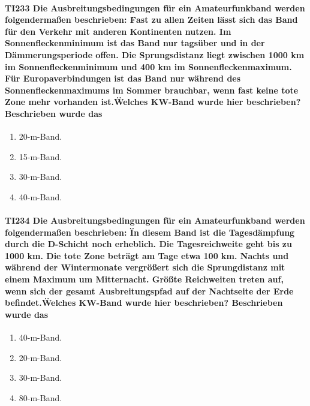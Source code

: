 \documentclass[8pt]{article}
\begin{document}
\paragraph*{TI233 Die Ausbreitungsbedingungen für ein Amateurfunkband werden folgendermaßen beschrieben: \"Fast zu allen Zeiten lässt sich das Band für den Verkehr mit anderen Kontinenten nutzen. Im Sonnenfleckenminimum ist das Band nur tagsüber und in der Dämmerungsperiode offen. Die Sprungsdistanz liegt zwischen 1000 km im Sonnenfleckenminimum und 400 km im Sonnenfleckenmaximum. Für Europaverbindungen ist das Band nur während des Sonnenfleckenmaximums im Sommer brauchbar, wenn fast keine tote Zone mehr vorhanden ist.\" Welches KW-Band wurde hier beschrieben? Beschrieben wurde das}
\begin{enumerate}[nolistsep,label=\Alph*]
\item 20-m-Band.
\item 15-m-Band.
\item 30-m-Band.
\item 40-m-Band.
\end{enumerate}

\paragraph*{TI234 Die Ausbreitungsbedingungen für ein Amateurfunkband werden folgendermaßen beschrieben: \"In diesem Band ist die Tagesdämpfung durch die D-Schicht noch erheblich. Die Tagesreichweite geht bis zu 1000 km. Die tote Zone beträgt am Tage etwa 100 km. Nachts und während der Wintermonate vergrößert sich die Sprungdistanz mit einem Maximum um Mitternacht. Größte Reichweiten treten auf, wenn sich der gesamt Ausbreitungspfad auf der Nachtseite der Erde befindet.\" Welches KW-Band wurde hier beschrieben? Beschrieben wurde das}
\begin{enumerate}[nolistsep,label=\Alph*]
\item 40-m-Band.
\item 20-m-Band.
\item 30-m-Band.
\item 80-m-Band.
\end{enumerate}
\end{document}
